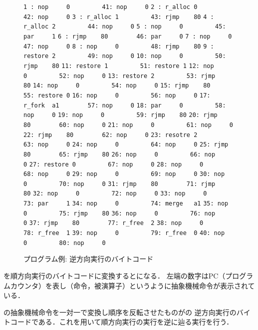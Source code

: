 \documentclass[submit,PRO]{ipsj}
\def\|{\verb|}
\begin{document}
\begin{figure}[tb]
\vbox{
\hbox{\|1 : nop     0         41: nop     0|}
\hbox{\|2 : r_alloc 0         42: nop     0|}
\hbox{\|3 : r_alloc 1         43: rjmp    80|}
\hbox{\|4 : r_alloc 2         44: nop     0|}
\hbox{\|5 : nop     0         45: par     1|}
\hbox{\|6 : rjmp    80        46: par     0|}
\hbox{\|7 : nop     0         47: nop     0|}
\hbox{\|8 : nop     0         48: rjmp    80|}
\hbox{\|9 : restore 2         49: nop     0|}
\hbox{\|10: nop     0         50: rjmp    80|}
\hbox{\|11: restore 1         51: restore 1|}
\hbox{\|12: nop     0         52: nop     0|}
\hbox{\|13: restore 2         53: rjmp    80|}
\hbox{\|14: nop     0         54: nop     0|}
\hbox{\|15: rjmp    80        55: restore 0|}
\hbox{\|16: nop     0         56: nop     0|}
\hbox{\|17: r_fork  a1        57: nop     0|}
\hbox{\|18: par     0         58: nop     0|}
\hbox{\|19: nop     0         59: rjmp    80|}
\hbox{\|20: rjmp    80        60: nop     0|}
\hbox{\|21: nop     0         61: nop     0|}
\hbox{\|22: rjmp    80        62: nop     0|}
\hbox{\|23: resotre 2         63: nop     0|}
\hbox{\|24: nop     0         64: nop     0|}
\hbox{\|25: rjmp    80        65: rjmp    80|}
\hbox{\|26: nop     0         66: nop     0|}
\hbox{\|27: restore 0         67: nop     0|}
\hbox{\|28: nop     0         68: nop     0|}
\hbox{\|29: nop     0         69: nop     0|}
\hbox{\|30: nop     0         70: nop     0|}
\hbox{\|31: rjmp    80        71: rjmp    80|}
\hbox{\|32: nop     0         72: nop     0|}
\hbox{\|33: nop     0         73: par     1|}
\hbox{\|34: nop     0         74: merge   a1|} 
\hbox{\|35: nop     0         75: rjmp    80|}
\hbox{\|36: nop     0         76: nop     0|}
\hbox{\|37: rjmp    80        77: r_free  2|}
\hbox{\|38: nop     0         78: r_free  1|}
\hbox{\|39: nop     0         79: r_free  0|}
\hbox{\|40: nop     0         80: nop     0|}
}
\centerline{}
\caption{プログラム例: 逆方向実行のバイトコード}
\label{fig:backward}
\end{figure}

を順方向実行のバイトコードに変換するとになる．
左端の数字はPC（プログラムカウンタ）を表し（命令，被演算子）というように抽象機械命令が表示されている．

の抽象機械命令を一対一で変換し順序を反転させたものがの
逆方向実行のバイトコードである．これを用いて順方向実行の実行を逆に辿る実行を行う．
\end{document}
